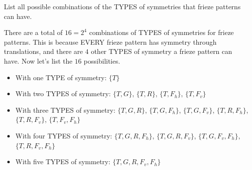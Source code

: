 \documentclass[noauthor,nooutcomes,hints,handout]{ximera}
\begin{document}
\mynewpage


\begin{question}
  List all possible combinations of the TYPES of symmetries that
  frieze patterns can have.
  \begin{freeResponse}
    There are a total of $16 = 2^4$ combinations of TYPES of
    symmetries for frieze patterns. This is because EVERY frieze
    pattern has symmetry through translations, and there are $4$ other
    TYPES of symmetry a frieze pattern can have.  Now let's list the
    $16$ possibilities.
    \begin{itemize}
    \item With one TYPE of symmetry: $\{T\}$
    \item With two TYPES of symmetry: $\{T,G\}$, $\{T,R\}$, $\{T,F_h\}$, $\{T,F_v\}$
    \item With three TYPES of symmetry: $\{T,G,R\}$, $\{T,G,F_h\}$, $\{T,G,F_v\}$, $\{T,R,F_h\}$, $\{T,R,F_v\}$, $\{T,F_v,F_h\}$
    \item With four TYPES of symmetry:  $\{T,G,R,F_h\}$, $\{T,G,R,F_v\}$, $\{T,G,F_v,F_h\}$, $\{T,R,F_v,F_h\}$
    \item With five TYPES of symmetry: $\{T,G,R,F_v,F_h\}$
    \end{itemize}
  \end{freeResponse}
\end{question}
\mynewpage
\end{document}
